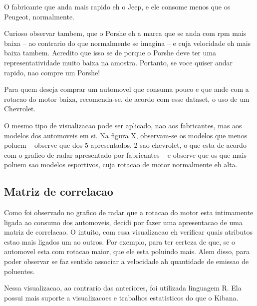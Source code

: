 \documentclass[10pt, conference]{IEEEtran}
\begin{document}
O fabricante que anda mais rapido eh o Jeep, e ele consome menos que os Peugeot, normalmente.

Curioso observar tambem, que o Porshe eh a marca que se anda com rpm mais baixa -- ao contrario do que normalmente
se imagina -- e cuja velocidade eh mais baixa tambem. Acredito que isso se de porque o Porshe deve ter uma
representatividade muito baixa na amostra. Portanto, se voce quiser andar rapido, nao compre um Porshe!

Para quem deseja comprar um automovel que consuma pouco e que ande com a rotacao do motor baixa, recomenda-se,
de acordo com esse dataset, o uso de um Chevrolet.



O mesmo tipo de visualizacao pode ser aplicado, nao aos fabricantes, mas aos modelos dos automoveis em si.
Na figura X, observam-se os modelos que menos poluem -- observe que dos 5 apresentados, 2 sao chevrolet, o
que esta de acordo com o grafico de radar apresentado por fabricantes -- e observe que os que mais poluem
sao modelos esportivos, cuja rotacao de motor normalmente eh alta.












\subsection{Matriz de correlacao}

Como foi observado no grafico de radar que a rotacao do motor esta intimamente ligada
ao consumo dos automoveis, decidi por fazer uma apresentacao de uma matriz de correlacao. 
O intuito, com essa visualizacao eh verificar quais atributos estao mais ligados um ao
outros. Por exemplo, para ter certeza de que, se o automovel esta com rotacao maior, que
ele esta poluindo mais. Alem disso, para poder observar se faz sentido associar a 
velocidade ah quantidade de emissao de poluentes.

Nessa visualizacao, ao contrario das anteriores, foi utilizada linguagem R. Ela possui
mais suporte a visualizacoes e trabalhos estatisticos do que o Kibana. 
\end{document}

